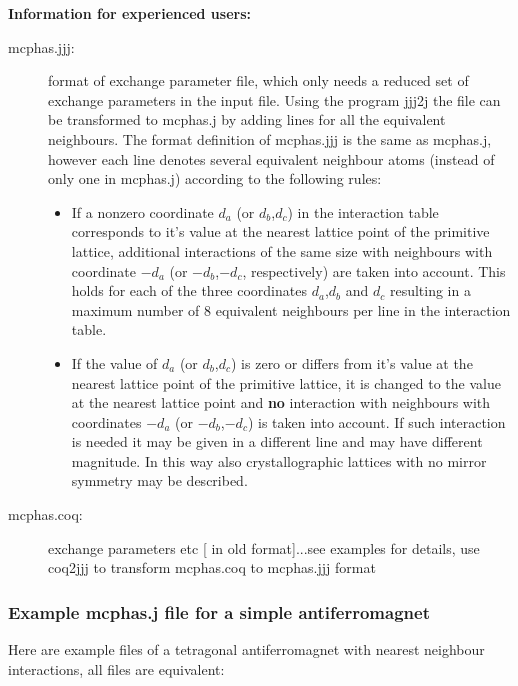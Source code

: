 {\small {\bf Information for experienced users:}
\begin{description}
\item[\prg mcphas.jjj:]
format of exchange parameter file, which only needs a reduced set of exchange
parameters in the input file. Using the program {\prg jjj2j} the file can be transformed
to {\prg mcphas.j} by adding lines for all the equivalent neighbours. The format definition
of {\prg mcphas.jjj} is the same as {\prg mcphas.j}, however each line denotes several
equivalent neighbour atoms (instead of only one in {\prg mcphas.j}) according to the
 following rules:
\begin{itemize}
\item If a nonzero coordinate $d_a$ (or $d_b$,$d_c$) in the interaction table
 corresponds to it's value at the nearest
 lattice point of the primitive lattice,
  additional interactions of the same size
with  neighbours with coordinate $-d_a$ (or $-d_b$,$-d_c$, respectively)
are taken into account. This
holds for each of the three coordinates $d_a$,$d_b$ and $d_c$
 resulting in a maximum
number of 8 equivalent neighbours per line in the interaction table.
\item If the value of $d_a$ (or $d_b$,$d_c$) is zero or differs
from it's value at the nearest lattice point of the primitive lattice, it is 
changed to the value at the nearest lattice point and {\bf no} interaction 
with  neighbours with coordinates $-d_a$ (or $-d_b$,$-d_c$) is
 taken into account. If such
 interaction is needed it may be given in a different line and may
have different magnitude. In this way also crystallographic lattices
with no mirror symmetry may be described.
\end{itemize}
\item[\prg mcphas.coq:]   exchange parameters etc [ in old format]...see examples for details, use {\prg coq2jjj} to 
transform {\prg mcphas.coq} to {\prg mcphas.jjj} format
\end{description}

}


\subsubsection{Example {\prg mcphas.j} file for a simple antiferromagnet}

Here are example files of a tetragonal antiferromagnet with nearest neighbour interactions, all
files are equivalent:

